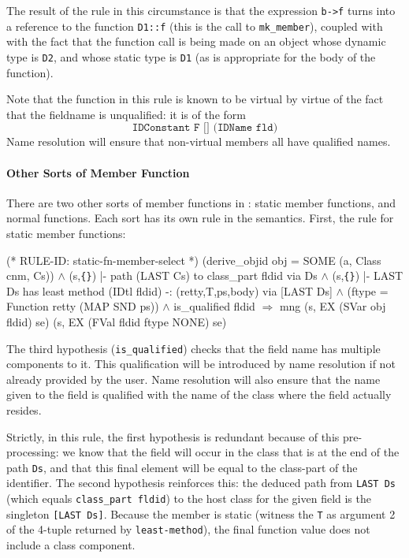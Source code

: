\documentclass[11pt]{article}
\newcommand{\lbr}{\texttt{\{}}
\newcommand{\rbr}{\texttt{\}}}
\begin{document}
The result of the rule in this circumstance is that the expression
\texttt{b->f} turns into a reference to the function \texttt{D1::f}
(this is the call to \texttt{mk_member}), coupled with with the fact
that the function call is being made on an object whose dynamic type
is \texttt{D2}, and whose static type is \texttt{D1} (as is
appropriate for the body of the function).

Note that the function in this rule is known to be virtual by virtue
of the fact that the fieldname is unqualified: it is of the form
\[
\texttt{IDConstant~F~[]~(IDName~fld)}
\]
Name resolution will ensure that non-virtual members all have
qualified names.

\paragraph{Other Sorts of Member Function}

There are two other sorts of member functions in \cpp{}: static
member functions, and normal functions.  Each sort has its own rule
in the semantics.
First, the rule for static member functions:
%
\begin{stdrule}
(* RULE-ID: static-fn-member-select *)
     (derive_objid obj = SOME (a, Class cnm,  Cs)) \(\land\)
     (s,\lbr\rbr) |- path (LAST Cs) to class_part fldid via Ds \(\land\)
     (s,\lbr\rbr) |- LAST Ds has least method
                  (IDtl fldid) -: (retty,T,ps,body)
                  via [LAST Ds] \(\land\)
     (ftype = Function retty (MAP SND ps)) \(\land\)
     is_qualified fldid
   \(\Rightarrow\)
     mng (s, EX (SVar obj fldid) se)
         (s, EX (FVal fldid ftype NONE) se)
\end{stdrule}
%
The third hypothesis (\texttt{is_qualified}) checks that the field
name has multiple components to it.  This qualification will be
introduced by name resolution if not already provided by the user.
Name resolution will also ensure that the name given to the field is
qualified with the name of the class where the field actually
resides.

%
Strictly, in this rule, the first hypothesis is redundant because of
this pre-processing: we know that the field will occur in the class
that is at the end of the path \texttt{Ds}, and that this final
element will be equal to the class-part of the identifier.  The second
hypothesis reinforces this: the deduced path from \texttt{LAST~Ds}
(which equals \texttt{class_part~fldid}) to the host class for the
given field is the singleton \texttt{[LAST~Ds]}.  Because the member
is static (witness the \texttt{T} as argument 2 of the 4-tuple
returned by \texttt{least-method}), the final function value does not
include a class component.
\end{document}
